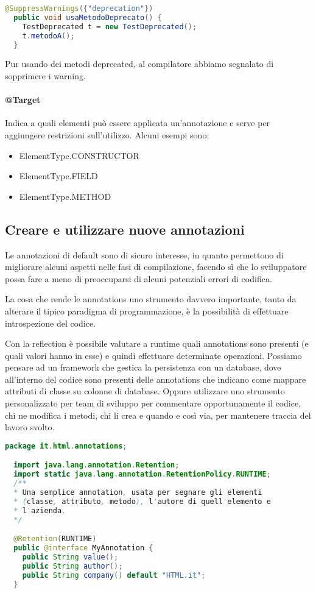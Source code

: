 \documentclass[a4paper,12pt,twoside]{book}
\begin{document}
\begin{lstlisting}[caption={}, label={lst:suppressedWarning}, language=Java]
  @SuppressWarnings({"deprecation"})
  public void usaMetodoDeprecato() {
    TestDeprecated t = new TestDeprecated();
    t.metodoA();
  }
\end{lstlisting}

Pur usando dei metodi deprecated, al compilatore abbiamo segnalato di
sopprimere i warning.

\paragraph{@Target}
Indica a quali elementi può essere applicata un'annotazione e serve
per aggiungere restrizioni sull'utilizzo.  Alcuni esempi sono:
\begin{itemize}
\item ElementType.CONSTRUCTOR
\item ElementType.FIELD
\item ElementType.METHOD
\end{itemize}


\subsection{Creare e utilizzare nuove annotazioni}
Le annotazioni di default sono di sicuro interesse, in quanto
permettono di migliorare alcuni aspetti nelle fasi di compilazione,
facendo sì che lo sviluppatore possa fare a meno di preoccuparsi di
alcuni potenziali errori di codifica.

La cosa che rende le annotations uno strumento davvero importante,
tanto da alterare il tipico paradigma di programmazione, è la
possibilità di effettuare introspezione del codice.

Con la reflection è possibile valutare a runtime quali annotations
sono presenti (e quali valori hanno in esse) e quindi effettuare
determinate operazioni. Possiamo pensare ad un framework che gestica
la persistenza con un database, dove all'interno del codice sono
presenti delle annotations che indicano come mappare attributi di
classe su colonne di database. Oppure utilizzare uno strumento
personalizzato per team di sviluppo per commentare opportunamente il
codice, chi ne modifica i metodi, chi li crea e quando e così via, per
mantenere traccia del lavoro svolto.


\begin{lstlisting}[caption={}, label={lst:creaAnnot}, language=Java]
  package it.html.annotations;

  import java.lang.annotation.Retention;
  import static java.lang.annotation.RetentionPolicy.RUNTIME;
  /**
  * Una semplice annotation, usata per segnare gli elementi
  * (classe, attributo, metodo), l'autore di quell'elemento e
  * l'azienda.
  */

  @Retention(RUNTIME)
  public @interface MyAnnotation {
    public String value();
    public String author();
    public String company() default "HTML.it";
  }
\end{lstlisting}
\end{document}
